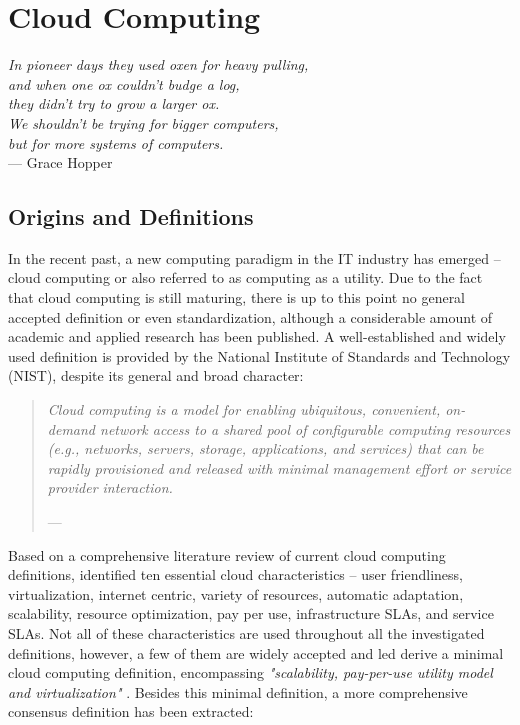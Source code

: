 \section{Cloud Computing}\label{ch:tf:paas}
\begin{flushright}{\slshape 
	In pioneer days they used oxen for heavy pulling,\\
	and when one ox couldn't budge a log,\\
	they didn't try to grow a larger ox.\\
	We shouldn't be trying for bigger computers,\\
	but for more systems of computers.} \\ \medskip
	--- Grace Hopper
\end{flushright}

\subsection{Origins and Definitions}

In the recent past, a new computing paradigm in the IT industry has emerged -- cloud computing or also referred to as computing as a utility. Due to the fact that cloud computing is still maturing, there is up to this point no general accepted definition or even standardization, although a considerable amount of academic and applied research has been published. A well-established and widely used definition is provided by the National Institute of Standards and Technology (NIST), despite its general and broad character:

\begin{quotation}{\slshape 
Cloud computing is a model for enabling ubiquitous, convenient, on-demand network access to a shared pool of configurable computing resources (e.g., networks, servers, storage, applications, and services) that can be rapidly provisioned and released with minimal management effort or service provider interaction.}
\vspace*{-7pt}
\begin{flushright}
	--- \citealp[p. 2]{Mell2011}
\end{flushright}
\end{quotation}

Based on a comprehensive literature review of current cloud computing definitions, \citet{Vaquero2009} identified ten essential cloud characteristics -- user friendliness, virtualization, internet centric, variety of resources, automatic adaptation, scalability, resource optimization, pay per use, infrastructure \acp{SLA}, and service \acp{SLA}. Not all of these characteristics are used throughout all the investigated definitions, however, a few of them are widely accepted and led \citet{Vaquero2009} derive a minimal cloud computing definition, encompassing \textit{"scalability, pay-per-use utility model and virtualization"} \citep[p. 51]{Vaquero2009}. Besides this minimal definition, a more comprehensive consensus definition has been extracted:

